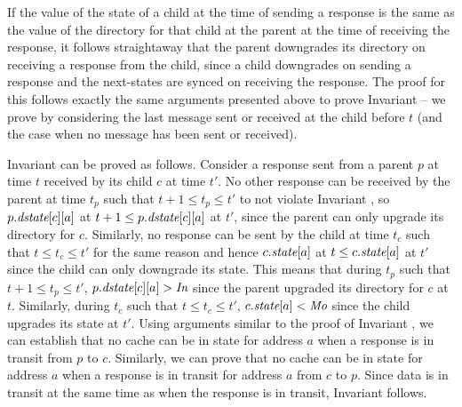 If the value of the state of a child at the time of sending a response is the
same as the value of the directory for that child at the parent at the time of
receiving the response, it follows straightaway that the parent downgrades its
directory on receiving a response from the child, since a child downgrades on
sending a response and the next-states are synced on receiving the response.
The proof for this follows exactly the same arguments presented above to prove
Invariant  -- we prove by considering the last message
sent or received at the child before $t$ (and the case when no message has been
sent or received).

Invariant  can be proved as follows. Consider a response
sent from a parent $p$ at time $t$ received by its child $c$ at time $t'$. No
other response can be received by the parent at time $t_p$ such that $t+1 \le
t_p \le t'$ to not violate Invariant , so $p.\textit{dstate}[c][a]$ at
$t+1 \le p.\textit{dstate}[c][a]$ at $t'$, since the parent can only upgrade its
directory for $c$. Similarly, no response can be sent by the child at time
$t_c$ such that $t \le t_c \le t'$ for the same reason and hence $c.\textit{state}[a]$
at $t \le c.\textit{state}[a]$ at $t'$ since the child can only downgrade its state.
This means that during $t_p$ such that $t+1 \le t_p \le t'$, $p.\textit{dstate}[c][a]
> \textit{In}$ since the parent upgraded its directory for $c$ at $t$. Similarly,
during $t_c$ such that $t \le t_c \le t'$, $c.\textit{state}[a] < \textit{Mo}$ since the
child upgrades its state at $t'$. Using arguments similar to the proof of
Invariant , we can establish that no cache can be in \Mo{}
state for address $a$ when a response is in transit from $p$ to $c$.
Similarly, we can prove that no cache can be in \Mo{} state for address $a$
when a response is in transit for address $a$ from $c$ to $p$. Since data is in
transit at the same time as when the response is in transit, Invariant
 follows.

